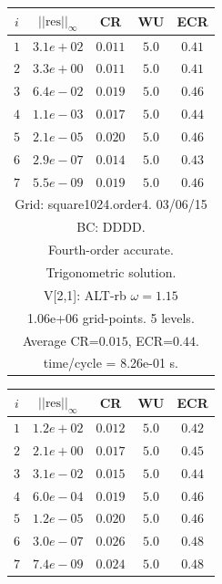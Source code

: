 \begin{table}[hbt]
\begin{center}
{\tablefontsize
\begin{tabular}{|c|c|c|c|c|} \hline 
 $i$   & $\vert\vert\mbox{res}\vert\vert_\infty$  &  CR     &  WU    & ECR  \\   \hline 
 $ 1$  & $ 3.1e+02$ & $0.011$ & $ 5.0$ & $0.41$ \\ 
 $ 2$  & $ 3.3e+00$ & $0.011$ & $ 5.0$ & $0.41$ \\ 
 $ 3$  & $ 6.4e-02$ & $0.019$ & $ 5.0$ & $0.46$ \\ 
 $ 4$  & $ 1.1e-03$ & $0.017$ & $ 5.0$ & $0.44$ \\ 
 $ 5$  & $ 2.1e-05$ & $0.020$ & $ 5.0$ & $0.46$ \\ 
 $ 6$  & $ 2.9e-07$ & $0.014$ & $ 5.0$ & $0.43$ \\ 
 $ 7$  & $ 5.5e-09$ & $0.019$ & $ 5.0$ & $0.46$ \\ 
\hline 
\multicolumn{5}{|c|}{Grid: square1024.order4. 03/06/15}  \\
\multicolumn{5}{|c|}{BC: DDDD.}  \\
\multicolumn{5}{|c|}{Fourth-order accurate.}  \\
\multicolumn{5}{|c|}{Trigonometric solution.}  \\
\multicolumn{5}{|c|}{V[2,1]: ALT-rb $\omega=1.15$}  \\
\multicolumn{5}{|c|}{1.06e+06 grid-points. 5 levels.}  \\
\multicolumn{5}{|c|}{Average CR=$0.015$, ECR=$0.44$.}  \\
\multicolumn{5}{|c|}{time/cycle = 8.26e-01 s.}  \\
\hline 
\end{tabular}
\begin{tabular}{|c|c|c|c|c|} \hline 
 $i$   & $\vert\vert\mbox{res}\vert\vert_\infty$  &  CR     &  WU    & ECR  \\   \hline 
 $ 1$  & $ 1.2e+02$ & $0.012$ & $ 5.0$ & $0.42$ \\ 
 $ 2$  & $ 2.1e+00$ & $0.017$ & $ 5.0$ & $0.45$ \\ 
 $ 3$  & $ 3.1e-02$ & $0.015$ & $ 5.0$ & $0.44$ \\ 
 $ 4$  & $ 6.0e-04$ & $0.019$ & $ 5.0$ & $0.46$ \\ 
 $ 5$  & $ 1.2e-05$ & $0.020$ & $ 5.0$ & $0.46$ \\ 
 $ 6$  & $ 3.0e-07$ & $0.026$ & $ 5.0$ & $0.48$ \\ 
 $ 7$  & $ 7.4e-09$ & $0.024$ & $ 5.0$ & $0.48$ \\ 

\end{tabular}}
\end{center}
\end{table}
